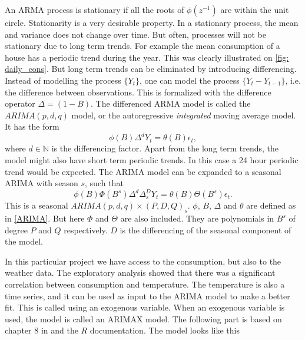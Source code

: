\noindent An ARMA process is stationary if all the roots of $\phi(z^{-1})$ are within the unit circle. Stationarity is a very desirable property. In a stationary process, the mean and variance does not change over time. But often, processes will not be stationary due to long term trends. For example the mean consumption of a house has a periodic trend during the year. This was clearly illustrated on \cref{fig: daily_cons}. But long term trends can be eliminated by introducing differencing. Instead of modelling the process $\{Y_t\}$, one can model the process $\{Y_t - Y_{t-1}\}$, i.e. the difference between observations. This is formalized with the difference operator $\Delta = (1-B)$. The differenced ARMA model is called the $ARIMA(p,d,q)$ model, or the autoregressive \textit{integrated} moving average model. It has the form
\begin{equation}
    \phi (B) \Delta^d Y_t = \theta (B) \epsilon_t,
    \label{ARIMA}
\end{equation}
where $d\in \mathbb{N}$ is the differencing factor. Apart from the long term trends, the model might also have short term periodic trends. In this case a 24 hour periodic trend would be expected. The ARIMA model can be expanded to a seasonal ARIMA with season $s$, such that
\begin{equation}
    \phi (B) \Phi (B^s) \Delta^d \Delta_s^D Y_t = \theta (B) \Theta (B^s) \epsilon_t.
    \label{eq:ARIMA}
\end{equation}
This is a seasonal $ARIMA(p,d,q)\times (P,D,Q)_s$. $\phi$, $B$, $\Delta$ and $\theta$ are defined as in \cref{ARIMA}. But here $\Phi$ and $\Theta$ are also included. They are polynomials in $B^s$ of degree $P$ and $Q$ respectively. $D$ is the differencing of the seasonal component of the model.

\noindent In this particular project we have access to the consumption, but also to the weather data. The exploratory analysis showed that there was a significant correlation between consumption and temperature. The temperature is also a time series, and it can be used as input to the ARIMA model to make a better fit. This is called using an exogenous variable. When an exogenous variable is used, the model is called an ARIMAX model. The following part is based on chapter $8$ in \cite{Time_Series_Analysis} and the $R$ documentation. The model looks like this


